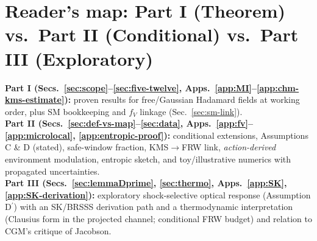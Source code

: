 \documentclass[aps,prd,onecolumn,superscriptaddress,nofootinbib]{revtex4-2}
\def\alpha{alpha}%
\def\alpha_M{alphaM}%
\begin{document}
\begin{abstract}
\smallskip
\textbf{Part III (Exploratory).} (i) An \emph{optional}, shock-selective \emph{optical} channel (Assumption D\(^{\prime}\)) reduces \(\Sigma\) only in high-shear shocked gas to address Bullet-type lensing offsets while preserving FRW distances. We retain a simple local saturating law in the text, and now provide a \emph{principled derivation path} from Schwinger–Keldysh (SK) hydrodynamics that makes \(\alpha_{\rm opt}\) a calculable function of ICM transport coefficients (App.~\ref{app:SK}; App.~\ref{app:SK-derivation}). (ii) A compact thermodynamic interpretation of the projected modular response: a Clausius-like identity holds at working order in the MI/moment-kill channel, and the FRW budget may be viewed as a \emph{coarse-grained} Clausius normalization \emph{conditional} on our KMS\(\to\)FRW hypotheses. We clarify the relation to the Casini–Galante–Myers critique of Jacobson.
\end{abstract}

\maketitle

\section*{Reader’s map: Part I (Theorem) vs.\ Part II (Conditional) vs.\ Part III (Exploratory)}
\noindent \textbf{Part I (Secs.~\ref{sec:scope}–\ref{sec:five-twelve}, Apps.~\ref{app:MI}–\ref{app:chm-kms-estimate}):} proven results for free/Gaussian Hadamard fields at working order, plus SM bookkeeping and \(f_V\) linkage (Sec.~\ref{sec:sm-link}).\\
\textbf{Part II (Secs.~\ref{sec:def-vs-map}–\ref{sec:data}, Apps.~\ref{app:fv}–\ref{app:microlocal}, \ref{app:entropic-proof}):} conditional extensions, Assumptions C \& D (stated), safe-window fraction, KMS\(\to\)FRW link, \emph{action-derived} environment modulation, entropic sketch, and toy/illustrative numerics with propagated uncertainties.\\
\textbf{Part III (Secs.~\ref{sec:lemmaDprime}, \ref{sec:thermo}, Apps.~\ref{app:SK}, \ref{app:SK-derivation}):} exploratory shock-selective optical response (Assumption D\(^{\prime}\)) with an SK/BRSSS derivation path and a thermodynamic interpretation (Clausius form in the projected channel; conditional FRW budget) and relation to CGM’s critique of Jacobson.
\end{document}
